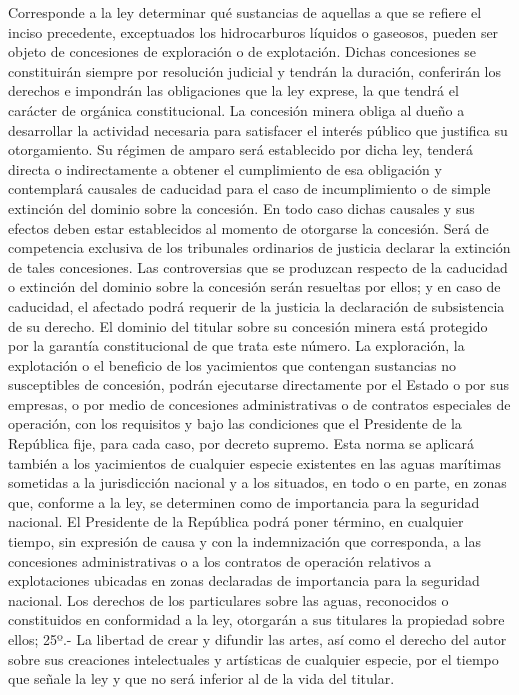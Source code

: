     Corresponde a la ley determinar qué sustancias de aquellas a que se refiere el inciso precedente, exceptuados los hidrocarburos líquidos o gaseosos, pueden ser objeto de concesiones de exploración o de explotación. Dichas concesiones se constituirán siempre por resolución judicial y tendrán la duración, conferirán los derechos e impondrán las obligaciones que la ley exprese, la que tendrá el carácter de orgánica constitucional. La concesión minera obliga al dueño a desarrollar la actividad necesaria para satisfacer el interés público que justifica su otorgamiento. Su régimen de amparo será establecido por dicha ley, tenderá directa o indirectamente a obtener el cumplimiento de esa obligación y contemplará causales de caducidad para el caso de incumplimiento o de simple extinción del dominio sobre la concesión. En todo caso dichas causales y sus efectos deben estar establecidos al momento de otorgarse la concesión.
    Será de competencia exclusiva de los tribunales ordinarios de justicia declarar la extinción de tales concesiones. Las controversias que se produzcan respecto de la caducidad o extinción del dominio sobre la concesión serán resueltas por ellos; y en caso de caducidad, el afectado podrá requerir de la justicia la declaración de subsistencia de su derecho.
    El dominio del titular sobre su concesión minera está protegido por la garantía constitucional de que trata este número.
    La exploración, la explotación o el beneficio de los yacimientos que contengan sustancias no susceptibles de concesión, podrán ejecutarse directamente por el Estado o por sus empresas, o por medio de concesiones administrativas o de contratos especiales de operación, con los requisitos y bajo las condiciones que el Presidente de la República fije, para cada caso, por decreto supremo. Esta norma se aplicará también a los yacimientos de cualquier especie existentes en las aguas marítimas sometidas a la jurisdicción nacional y a los situados, en todo o en parte, en zonas que, conforme a la ley, se determinen como de importancia para la seguridad nacional. El Presidente de la República podrá poner término, en cualquier tiempo, sin expresión de causa y con la indemnización que corresponda, a las concesiones administrativas o a los contratos de operación relativos a explotaciones ubicadas en zonas declaradas de importancia para la seguridad nacional.
    Los derechos de los particulares sobre las aguas, reconocidos o constituidos en conformidad a la ley, otorgarán a sus titulares la propiedad sobre ellos;
    25º.- La libertad de crear y difundir las artes, así como el derecho del autor sobre sus creaciones intelectuales y artísticas de cualquier especie, por el tiempo que señale la ley y que no será inferior al de la vida del titular.
